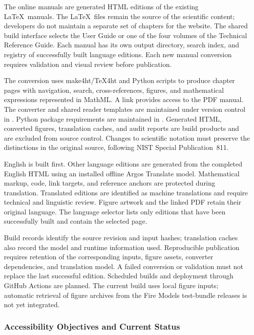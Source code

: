 \documentclass[11pt]{book}
\begin{document}
The online manuals are generated HTML editions of the existing \LaTeX\ manuals. The \LaTeX\ files remain the source of the scientific content; developers do not maintain a separate set of chapters for the website. The shared build interface selects the User Guide or one of the four volumes of the Technical Reference Guide. Each manual has its own output directory, search index, and registry of successfully built language editions. Each new manual conversion requires validation and visual review before publication.

The conversion uses make4ht/TeX4ht and Python scripts to produce chapter pages with navigation, search, cross-references, figures, and mathematical expressions represented in MathML. A link provides access to the PDF manual. The converter and shared reader templates are maintained under version control in . Python package requirements are maintained in . Generated HTML, converted figures, translation caches, and audit reports are build products and are excluded from source control. Changes to scientific notation must preserve the distinctions in the original source, following NIST Special Publication~811.

English is built first. Other language editions are generated from the completed English HTML using an installed offline Argos Translate model. Mathematical markup, code, link targets, and reference anchors are protected during translation. Translated editions are identified as machine translations and require technical and linguistic review. Figure artwork and the linked PDF retain their original language. The language selector lists only editions that have been successfully built and contain the selected page.

Build records identify the source revision and input hashes; translation caches also record the model and runtime information used. Reproducible publication requires retention of the corresponding inputs, figure assets, converter dependencies, and translation model. A failed conversion or validation must not replace the last successful edition. Scheduled builds and deployment through GitHub Actions are planned. The current build uses local figure inputs; automatic retrieval of figure archives from the Fire Models test-bundle releases is not yet integrated.

\subsubsection{Accessibility Objectives and Current Status}
\end{document}

